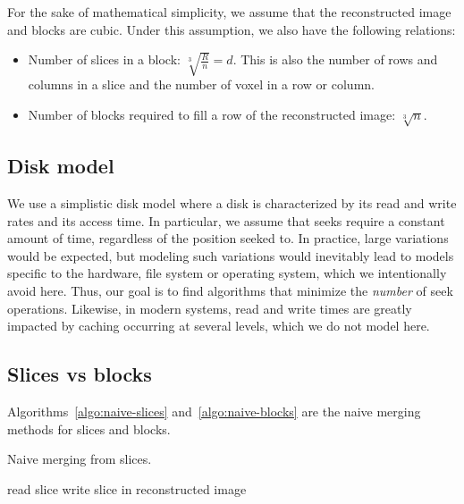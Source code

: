 \documentclass[10pt, conference, compsocconf]{IEEEtran}
\newcommand{\todo}[1]{\marginpar{\parbox{18mm}{\flushleft\tiny\color{red}\textbf{TODO}:
      #1}}}
\begin{document}
For the sake of mathematical simplicity, we assume that
the reconstructed image and blocks are cubic. Under this assumption,
we also have the following relations:
\begin{itemize}
\item Number of slices in a block: $\sqrt[3]{\frac{R}{n}}=d$. This is
  also the number of rows and columns in a slice and the number of
  voxel in a row or column.
\item Number of blocks required to fill a row of the reconstructed
  image: $\sqrt[3]{n}$.
\end{itemize}

\subsection{Disk model}

We use a simplistic disk model where a disk is characterized by its
read and write rates and its access time. In particular, we assume
that seeks require a constant amount of time, regardless of the
position seeked to. In practice, large variations would be expected,
but modeling such variations would inevitably lead to models specific
to the hardware, file system or operating system, which we
intentionally avoid here. Thus, our goal is to find algorithms that
minimize the \emph{number} of seek operations. Likewise, in modern
systems, read and write times are greatly impacted by caching
occurring at several levels, which we do not model here.


\subsection{Slices vs blocks}

Algorithms~\ref{algo:naive-slices} and~\ref{algo:naive-blocks} are the
naive merging methods for slices and blocks.
\begin{algorithm}[h]
\caption{Naive merging from slices.}
\label{algo:naive-slices} 
\begin{algorithmic}
    \STATE read slice
    \STATE write slice in reconstructed image
  \ENDFOR      
\end{algorithmic}
\end{algorithm}
\end{document}
